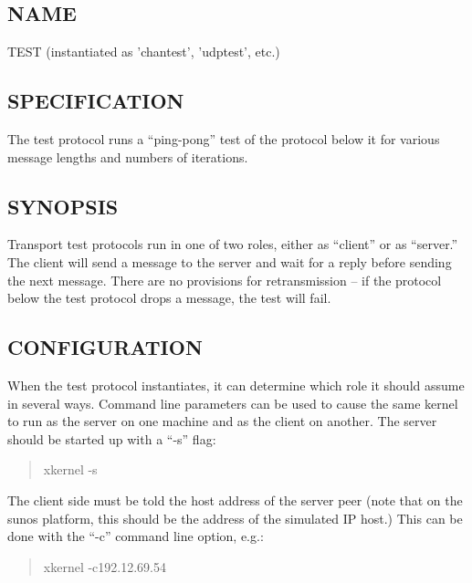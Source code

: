%
%

\subsection*{NAME}

\noindent TEST (instantiated as 'chantest', 'udptest', etc.)

\subsection*{SPECIFICATION}

The test protocol runs a ``ping-pong'' test of the protocol below it
for various message lengths and numbers of iterations. 

\subsection*{SYNOPSIS}

Transport test protocols run in one of two roles, either as ``client''
or as ``server.''  The client will send a message to the server and
wait for a reply before sending the next message.  There are no
provisions for retransmission -- if the protocol below the test
protocol drops a message, the test will fail.


\subsection*{CONFIGURATION}

When the test protocol instantiates, it can determine which role it
should assume in several ways.  Command line parameters can be used to
cause the same kernel to run as the server on one machine and as the
client on another.  The server should be started up with a ``-s''
flag:

\begin{quote}
\begin{tt}
xkernel -s
\end{tt}
\end{quote}

The client side must be told the host address of the server peer (note
that on the sunos platform, this should be the address of the
simulated IP host.)  This can be done with the ``-c'' command line
option, e.g.:

\begin{quote}
\begin{tt}
xkernel -c192.12.69.54
\end{tt}
\end{quote}


